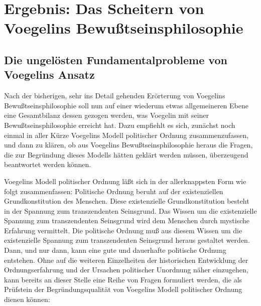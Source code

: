 
\section{Ergebnis: Das Scheitern von Voegelins Bewußtseinsphilosophie}

\subsection{Die ungelösten Fundamentalprobleme von Voegelins Ansatz}

Nach der bisherigen, sehr ins Detail gehenden Erörterung von Voegelins
Bewußtseinsphilosophie soll nun auf einer wiederum etwas allgemeineren Ebene
eine Gesamtbilanz dessen gezogen werden, was Voegelin mit seiner
Bewußtseinsphilosophie erreicht hat. Dazu empfiehlt es sich, zunächst noch
einmal in aller Kürze Voegelins Modell politischer Ordnung zusammenzufassen,
und dann zu klären, ob aus Voegelins Bewußtseinsphilosophie heraus die Fragen,
die zur Begründung dieses Modells hätten geklärt werden müssen, überzeugend
beantwortet werden können.

Voegelins Modell politischer Ordnung läßt sich in der allerknappsten Form wie
folgt zusammenfassen: Politische Ordnung beruht auf der existenziellen
Grundkonstitution des Menschen. Diese existenzielle Grundkonstitution besteht
in der Spannung zum transzendenten Seinsgrund. Das Wissen um die existenzielle
Spannung zum transzendenten Seinsgrund wird dem Menschen durch mystische
Erfahrung vermittelt. Die politische Ordnung muß aus diesem Wissen um die
existenzielle Spannung zum transzendenten Seinsgrund heraus gestaltet werden.
Dann, und nur dann, kann eine gute und dauerhafte politische Ordnung
entstehen. Ohne auf die weiteren Einzelheiten der historischen Entwicklung der
Ordnungserfahrung und der Ursachen politischer Unordnung näher einzugehen,
kann bereits an dieser Stelle eine Reihe von Fragen formuliert werden, die
als Prüfstein der Begründungsqualität von Voegelins Modell politischer Ordnung
dienen können:

